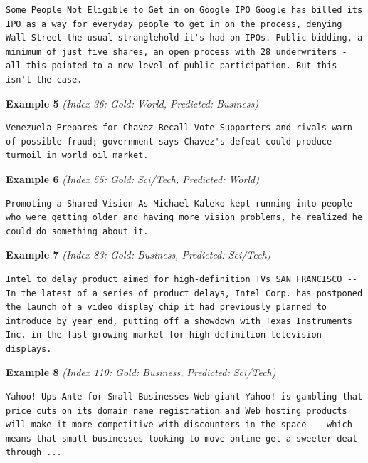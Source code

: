 \begin{Verbatim}[breaklines=true,breakanywhere=true,fontsize=\small]
Some People Not Eligible to Get in on Google IPO Google has billed its IPO as a way for everyday people to get in on the process, denying Wall Street the usual stranglehold it's had on IPOs. Public bidding, a minimum of just five shares, an open process with 28 underwriters - all this pointed to a new level of public participation. But this isn't the case.
\end{Verbatim}

\noindent
\textbf{Example 5} \quad \textit{(Index 36: Gold: World, Predicted: Business)}

\begin{Verbatim}[breaklines=true,breakanywhere=true,fontsize=\small]
Venezuela Prepares for Chavez Recall Vote Supporters and rivals warn of possible fraud; government says Chavez's defeat could produce turmoil in world oil market.
\end{Verbatim}

\noindent
\textbf{Example 6} \quad \textit{(Index 55: Gold: Sci/Tech, Predicted: World)}

\begin{Verbatim}[breaklines=true,breakanywhere=true,fontsize=\small]
Promoting a Shared Vision As Michael Kaleko kept running into people who were getting older and having more vision problems, he realized he could do something about it.
\end{Verbatim}

\noindent
\textbf{Example 7} \quad \textit{(Index 83: Gold: Business, Predicted: Sci/Tech)}

\begin{Verbatim}[breaklines=true,breakanywhere=true,fontsize=\small]
Intel to delay product aimed for high-definition TVs SAN FRANCISCO -- In the latest of a series of product delays, Intel Corp. has postponed the launch of a video display chip it had previously planned to introduce by year end, putting off a showdown with Texas Instruments Inc. in the fast-growing market for high-definition television displays.
\end{Verbatim}

\noindent
\textbf{Example 8} \quad \textit{(Index 110: Gold: Business, Predicted: Sci/Tech)}

\begin{Verbatim}[breaklines=true,breakanywhere=true,fontsize=\small]
Yahoo! Ups Ante for Small Businesses Web giant Yahoo! is gambling that price cuts on its domain name registration and Web hosting products will make it more competitive with discounters in the space -- which means that small businesses looking to move online get a sweeter deal through ...
\end{Verbatim}

